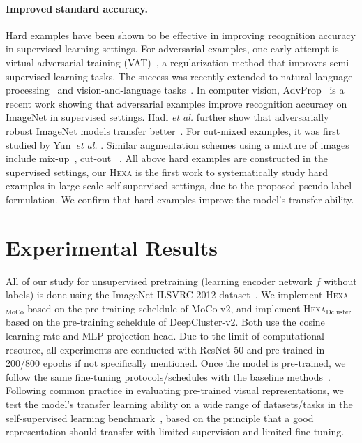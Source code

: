 \documentclass[10pt,twocolumn,letterpaper]{article}
\newcommand{\ea}[0]{\emph{et al. }}
\newcommand{\shortname}{\textsc{Hexa}}
\begin{document}
\paragraph{Improved standard accuracy.} 
Hard examples have been shown to be effective in improving recognition accuracy in supervised learning settings.
For adversarial examples, one early attempt is virtual adversarial training (VAT)~\cite{miyato2018virtual}, a regularization method that improves semi-supervised learning tasks. The success was recently extended to natural language processing~\cite{wang2019improving,cheng2019robust,liu2020adversarial} and  vision-and-language tasks~\cite{gan2020large}. In computer vision, AdvProp~\cite{xie2020adversarial} is a recent work showing that  adversarial examples improve recognition accuracy on ImageNet in supervised settings. Hadi \ea further show that adversarially robust ImageNet models transfer better~\cite{salman2020adversarially}. For cut-mixed examples, it was first studied by Yun~\ea\cite{yun2019cutmix}. Similar augmentation schemes using a mixture of images include mix-up~\cite{zhang2017mixup}, cut-out~\cite{devries2017improved} \etc.
All above hard examples are constructed in the supervised settings, our \shortname{} is the first work to systematically study hard examples in large-scale self-supervised settings, due to the proposed pseudo-label formulation.  We confirm that hard examples improve the model's transfer ability. 


\section{Experimental Results}



All of our study for unsupervised
pretraining (learning encoder network $f$ without labels)
is done using the ImageNet ILSVRC-2012 dataset~\cite{deng2009imagenet}. 
We implement \shortname{}$_{\text{MoCo}}$ based on the pre-training scheldule of MoCo-v2, and  implement \shortname{}$_{\text{Dcluster}}$ based on the pre-training scheldule of DeepCluster-v2. Both use the cosine learning rate and MLP projection head. Due to the limit of computational resource, all experiments are conducted with ResNet-50 and pre-trained in 200/800 epochs if not specifically mentioned. 
Once the model is pre-trained, we follow the same fine-tuning protocols/schedules with the baseline methods~\cite{he2020momentum,caron2020unsupervised}.
Following common practice in evaluating pre-trained visual representations, we test the model's transfer learning ability on a wide range of datasets/tasks in the self-supervised learning benchmark~\cite{goyal2019scaling}, based on the principle that a good representation should transfer with limited supervision
and limited fine-tuning.
\end{document}
